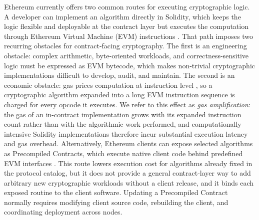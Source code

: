 \documentclass[pdflatex,sn-mathphys-num]{sn-jnl}%
\theoremstyle{thmstyleone}%
\theoremstyle{thmstyletwo}%
\theoremstyle{thmstylethree}%
\begin{document}
Ethereum currently offers two common routes for executing cryptographic logic. A developer can implement an algorithm directly in Solidity, which keeps the logic flexible and deployable at the contract layer but executes the computation through Ethereum Virtual Machine (EVM) instructions \cite{woodEthereumYellowPaper,ethereumEVM}. That path imposes two recurring obstacles for contract-facing cryptography. The first is an engineering obstacle: complex arithmetic, byte-oriented workloads, and correctness-sensitive logic must be expressed as EVM bytecode, which makes non-trivial cryptographic implementations difficult to develop, audit, and maintain. The second is an economic obstacle: gas prices computation at instruction level \cite{woodEthereumYellowPaper,buterin2016eip150}, so a cryptographic algorithm expanded into a long EVM instruction sequence is charged for every opcode it executes. We refer to this effect as \emph{gas amplification}: the gas of an in-contract implementation grows with its expanded instruction count rather than with the algorithmic work performed, and computationally intensive Solidity implementations therefore incur substantial execution latency and gas overhead. Alternatively, Ethereum clients can expose selected algorithms as Precompiled Contracts, which execute native client code behind predefined EVM interfaces \cite{evmCodesPrecompiled}. This route lowers execution cost for algorithms already fixed in the protocol catalog, but it does not provide a general contract-layer way to add arbitrary new cryptographic workloads without a client release, and it binds each exposed routine to the client software. Updating a Precompiled Contract normally requires modifying client source code, rebuilding the client, and coordinating deployment across nodes.
\end{document}
